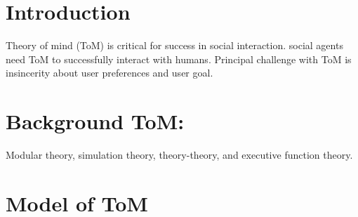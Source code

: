 \documentclass{llncs}
\begin{document}
\title{\vskip -10pt}

\author{Lydia Ould Ouali, Charles Rich \and
Nicolas Sabouret }

\maketitle 
\begin{abstract}\vskip -20pt
  
\end{abstract}

\section{Introduction}
Theory of mind (ToM) is critical for success in social interaction. 
social agents need ToM to successfully interact with humans.
Principal challenge with ToM is insincerity  about user preferences and user goal.

\section{Background ToM:}
Modular theory, 
simulation theory, 
theory-theory, 
and executive function theory.

\section{Model of ToM}

\vskip 4pt


\end{document}
